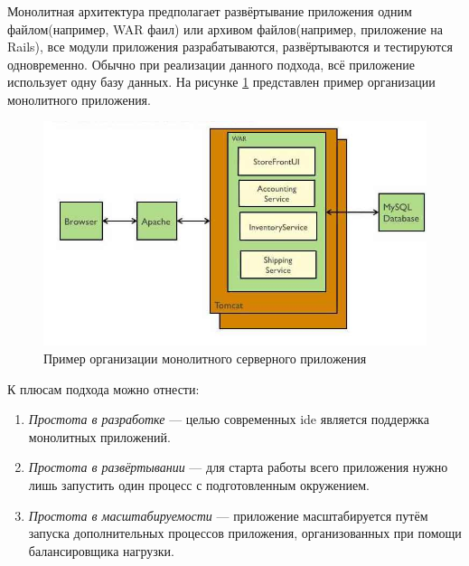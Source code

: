 \subsubsection {}
\label{sec:analysis:research:backArch:monolith}

Монолитная архитектура предполагает развёртывание приложения одним файлом(например, WAR фаил) или архивом файлов(например, приложение на Rails), все модули приложения разрабатываются, развёртываются и тестируются одновременно. Обычно при реализации данного подхода, всё приложение использует одну базу данных. На рисунке \ref{sec:analysis:research:arch:back:monolith} представлен пример организации монолитного приложения. \cite{microservices:ma}

\begin{figure}[h]
  \centering
    \includegraphics[width=1\textwidth]{inc/img/backend-monolith.jpg}
  \caption{Пример организации монолитного серверного приложения}
  \label{sec:analysis:research:arch:back:monolith}
\end{figure}

К плюсам подхода можно отнести:

\begin{enumerate}
	\item \emph{Простота в разработке} --- целью современных \gls{ide} является поддержка монолитных приложений.
	\item \emph{Простота в развёртывании} --- для старта работы всего приложения нужно лишь запустить один процесс с подготовленным окружением.
	\item \emph{Простота в масштабируемости} --- приложение масштабируется путём запуска дополнительных процессов приложения, организованных при помощи балансировщика нагрузки.
\end{enumerate}

